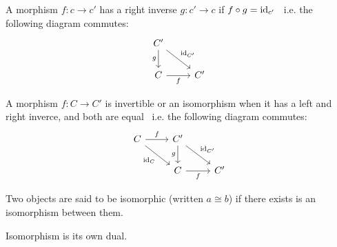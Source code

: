 
\begin{definition}
  A morphism $f: c\to c'$ has a right inverse $g: c'\to c$ if $f\circ g =
  \mathrm{id}_{c'}$~\parencite[p.~19]{lane:working_mathematician} i.e. the following
  diagram commutes:
  \[\begin{tikzcd}[ampersand replacement=\&]
    {C'} \\
    C \& {C'}
    \arrow["f"', from=2-1, to=2-2]
    \arrow["g"', from=1-1, to=2-1]
    \arrow["{\id_{C'}}", from=1-1, to=2-2]
  \end{tikzcd}\]
\end{definition}


\begin{definition}
  A morphism $f: C\to C'$ is invertible or an isomorphism when it has a left and
  right inverce, and both are
  equal~\parencite[p.~19]{lane:working_mathematician} i.e. the following diagram
  commutes:
  \[\begin{tikzcd}[ampersand replacement=\&]
    C \& {C'} \\
    \& C \& {C'}
    \arrow["f"', from=2-2, to=2-3]
    \arrow["g"', from=1-2, to=2-2]
    \arrow["{\id_{C'}}", from=1-2, to=2-3]
    \arrow["f", from=1-1, to=1-2]
    \arrow["{\id_C}"', from=1-1, to=2-2]
  \end{tikzcd}\]
\end{definition}

\begin{remark}
  Two objects are said to be isomorphic (written $a\cong b$) if there exists is
  an isomorphism between them.
\end{remark}

\begin{remark}
  Isomorphism is its own dual.
\end{remark}

